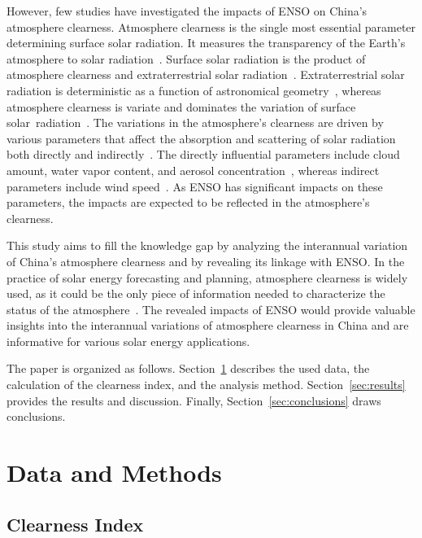 \documentclass[atmosphere,article,accept,pdftex,moreauthors]{Definitions/mdpi}
\begin{document}
However, few studies have investigated the impacts of ENSO on China's atmosphere clearness. Atmosphere clearness is the single most essential parameter determining surface solar radiation. It measures the transparency of the Earth's atmosphere to solar radiation~\mbox{\cite{liu1960SE, udo2000SE}}. Surface solar radiation is the product of atmosphere clearness and extraterrestrial solar radiation~\cite{jung2016A, apeh2021S, olukemisoneye2021A}. Extraterrestrial solar radiation is deterministic as a function of astronomical geometry~\cite{liu1960SE, cooper1969SE}, whereas atmosphere clearness is variate and dominates the variation of surface \mbox{solar radiation~\cite{apeh2021S, udo2000SE}}. The variations in the atmosphere's clearness are driven by various parameters that affect the absorption and scattering of solar radiation both directly and indirectly~\cite{che2005GRL, liu1960SE}. The directly influential parameters include cloud amount, water vapor content, and aerosol concentration~\cite{tang2016ACP}, whereas indirect parameters include wind speed~\cite{zhao2022JC, sun2018JGRA}. As ENSO has significant impacts on these parameters, the impacts are expected to be reflected in the atmosphere's clearness.

This study aims to fill the knowledge gap by analyzing the interannual variation of China's atmosphere clearness and by revealing its linkage with ENSO\@. In the practice of solar energy forecasting and planning, atmosphere clearness is widely used, as it could be the only piece of information needed to characterize the status of the atmosphere~\cite{perez1990SE, lauret2022S}. The revealed impacts of ENSO would provide valuable insights into the interannual variations of atmosphere clearness in China and are informative for various solar energy applications.

The paper is organized as follows. Section~\ref{sec:datamethods} describes the used data, the calculation of the clearness index, and the analysis method. Section~\ref{sec:results} provides the results and discussion. Finally, Section~\ref{sec:conclusions} draws conclusions.

\section{Data and Methods}\label{sec:datamethods}

\subsection{Clearness Index}\label{sec:clearnessindex}
\end{document}
